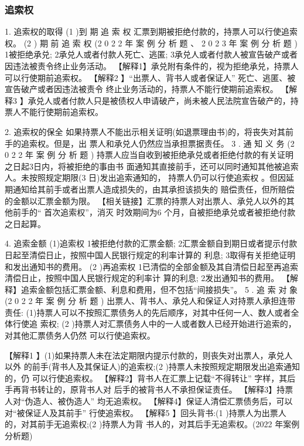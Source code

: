 \documentclass[UTF8,12pt]{ctexart}
\numberwithin{equation}{section} %
\numberwithin{figure}{section}
\numberwithin{table}{section}
\begin{document}
	\subsubsection{追索权}
	
	1. 追索权的取得
	(1 )到 期 追 索 权
	汇票到期被拒绝付款的，持票人可以行使追索权。
	(2 ) 期 前 追 索 权 (2 0 2 2 年 案 例 分 析 题 、 2 0 2 3 年 案 例 分 析 题 ) 1被拒绝承兑;
	2承兑人或者付款人死亡、逃匿; 3承兑人或者付款人被宣告破产或者因违法被责令终止业务活动。
	【解释1】承兑附有条件的，视为拒绝承兑，持票人可以行使期前追索权。
	【解释2 】“出票人、背书人或者保证人” 死亡、逃匿、被宣告破产或者因违法被责令 终止业务活动的，持票人不能行使期前追索权。
	【解释3 】承兑人或者付款人只是被债权人申请破产，尚未被人民法院宣告破产的，持 票人不能行使期前追索权。
	
	2. 追索权的保全 如果持票人不能出示相关证明(如退票理由书)的，将丧失对其前手的追索权。但是，出 票人和承兑人仍然应当承担票据责任。
	3 . 通 知 义 务 (2 0 2 2 年 案 例 分 析 题 ) 持票人应当自收到被拒绝承兑或者拒绝付款的有关证明之日起3日内，将被拒绝的事由书 面通知其直接前手，还可以同时通知其他被追索人。未按照规定期限(3 日)发出追索通知的， 持票人仍可以行使追索权 。但因延期通知给其前手或者出票人造成损失的，由其承担该损失的 赔偿责任，但所赔偿的金额以汇票金额为限。
	【相关链接】汇票的持票人对出票人、承兑人以外的其他前手的“ 首次追索权”，消灭 时效期间为6 个月，自被拒绝承兑或者被拒绝付款之日起算。
	
	4. 追索金额
	(1)追索权
	1被拒绝付款的汇票金额; 2汇票金额自到期日或者提示付款日起至清偿日止，按照中国人民银行规定的利率计算的 利息;
	3取得有关拒绝证明和发出通知书的费用。
	(2 )再追索权 1已清偿的全部金额及其自清偿日起至再追索清偿日止，按照中国人民银行规定的利率计 算的利息;
	2发出通知书的费用。 【解释】追索金额包括汇票金额、利息和费用，但不包括“间接损失”。
	5 . 追 索 对 象 (2 0 2 2 年 案 例 分 析 题 ) 出票人、背书人、承兑人和保证人对持票人承担连带责任: (1)持票人可以不按照汇票债务人的先后顺序，对其中任何一人、数人或者全体行使追 索权;
	(2 )持票人对汇票债务人中的一人或者数人已经开始进行追索的，对其他汇票债务人仍然 可以行使追索权。
	
	【解释1 】(1)如果持票人未在法定期限内提示付款的，则丧失对出票人，承兑人以外 的前手(背书人及其保证人)的追索权;(2 )持票人未按照规定期限发出追索通知的，仍 可以行使追索权。
	【解释2】背书人在汇票上记载“不得转让” 字样，其后手再背书转让的，原背书人对 后手的被背书人不承担保证责任。
	【解释3】持票人对“伪造人、被伪造人” 均无追索权。 【解释4】保证人清偿汇票债务后，可以对“被保证人及其前手” 行使追索权。 【解释5 】回头背书:(1 )持票人为出票人的，对其前手无追索权;(2 )持票人为背 书人的，对其后手无追索权。(2022 年案例分析题)
	
\end{document}
